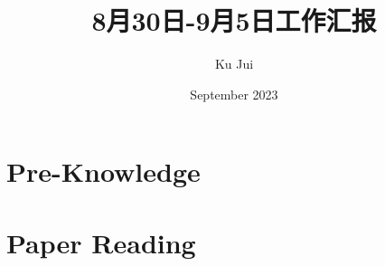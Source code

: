\documentclass[letterpaper,10pt]{article}
\begin{document}
	
	
	\title{\songti {}8月30日-9月5日工作汇报}
	\author{\textrm{Ku Jui}}
	\date{\textrm{September 2023}}
	\maketitle
	
	\renewcommand{\figurename}{Figure} %
	\renewcommand{\contentsname}{Contents}
	\renewcommand{\tablename}{Table}
	\tableofcontents  %
	
	\part{Pre-Knowledge}	

	
	

	
	\part{Paper Reading}
	
\end{document}
